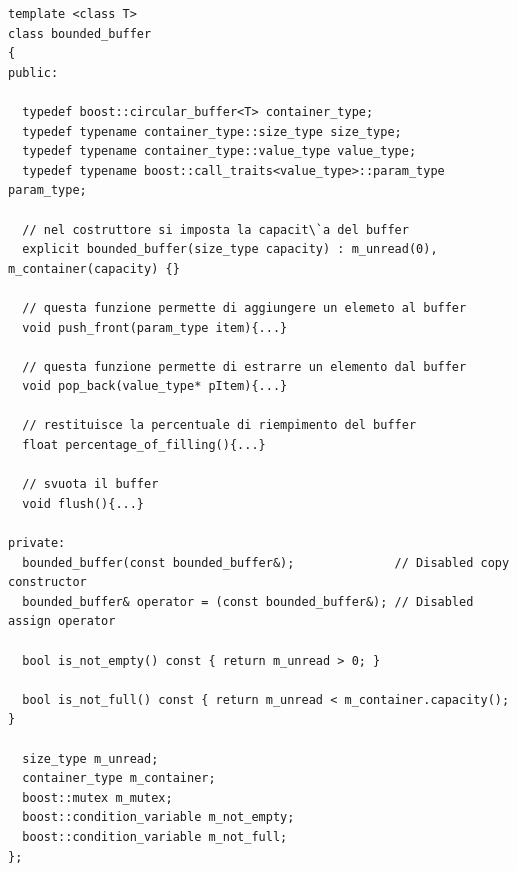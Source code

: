 \documentclass[10pt,a4paper]{article}
\begin{document}
\begin{lstlisting}[style=mycpp, caption=librerie usate, captionpos=b, label={lst:FIFO}]
template <class T>
class bounded_buffer
{
public:

  typedef boost::circular_buffer<T> container_type;
  typedef typename container_type::size_type size_type;
  typedef typename container_type::value_type value_type;
  typedef typename boost::call_traits<value_type>::param_type param_type;

  // nel costruttore si imposta la capacit\`a del buffer
  explicit bounded_buffer(size_type capacity) : m_unread(0), m_container(capacity) {}

  // questa funzione permette di aggiungere un elemeto al buffer
  void push_front(param_type item){...}

  // questa funzione permette di estrarre un elemento dal buffer 
  void pop_back(value_type* pItem){...}

  // restituisce la percentuale di riempimento del buffer
  float percentage_of_filling(){...}

  // svuota il buffer
  void flush(){...}

private:
  bounded_buffer(const bounded_buffer&);              // Disabled copy constructor
  bounded_buffer& operator = (const bounded_buffer&); // Disabled assign operator

  bool is_not_empty() const { return m_unread > 0; }

  bool is_not_full() const { return m_unread < m_container.capacity(); }

  size_type m_unread;
  container_type m_container;
  boost::mutex m_mutex;
  boost::condition_variable m_not_empty;
  boost::condition_variable m_not_full;
};
\end{lstlisting}
\end{document}
